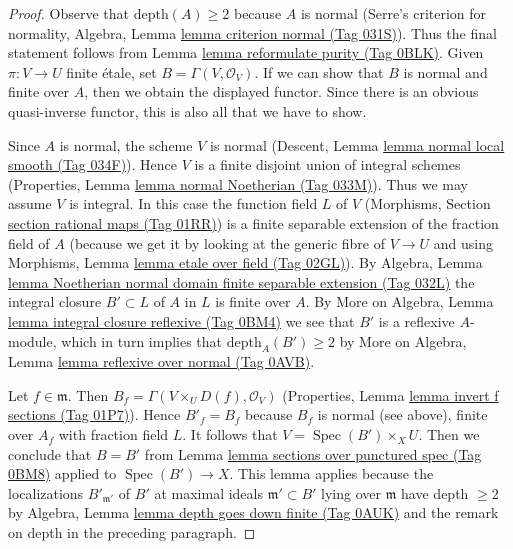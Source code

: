 \documentclass{amsart}
\theoremstyle{plain}
\theoremstyle{definition}
\theoremstyle{remark}
\numberwithin{equation}{subsection}
\def\Spec{\mathop{\mathrm{Spec}}}
\begin{document}
\begin{proof}
Observe that $\text{depth}(A) \geq 2$ because $A$ is normal
(Serre's criterion for normality, Algebra, Lemma
\href{https://stacks.math.columbia.edu/tag/031S}{lemma criterion normal (Tag 031S)}).
Thus the final statement follows from Lemma \href{https://stacks.math.columbia.edu/tag/0BLK}{lemma reformulate purity (Tag 0BLK)}.
Given $\pi : V \to U$ finite \'etale, set $B = \Gamma(V, \mathcal{O}_V)$.
If we can show that $B$ is normal and finite over $A$, then
we obtain the displayed functor. Since there is an obvious
quasi-inverse functor, this is also all that we have to show.

\medskip\noindent
Since $A$ is normal, the scheme $V$ is normal
(Descent, Lemma \href{https://stacks.math.columbia.edu/tag/034F}{lemma normal local smooth (Tag 034F)}).
Hence $V$ is a finite disjoint union of integral schemes
(Properties, Lemma \href{https://stacks.math.columbia.edu/tag/033M}{lemma normal Noetherian (Tag 033M)}).
Thus we may assume $V$ is integral.
In this case the function field $L$ of $V$
(Morphisms, Section \href{https://stacks.math.columbia.edu/tag/01RR}{section rational maps (Tag 01RR)})
is a finite separable extension of the fraction field of $A$
(because we get it by looking at the generic fibre
of $V \to U$ and using Morphisms, Lemma
\href{https://stacks.math.columbia.edu/tag/02GL}{lemma etale over field (Tag 02GL)}).
By Algebra, Lemma
\href{https://stacks.math.columbia.edu/tag/032L}{lemma Noetherian normal domain finite separable extension (Tag 032L)}
the integral closure $B' \subset L$ of $A$ in $L$ is finite over $A$.
By More on Algebra, Lemma \href{https://stacks.math.columbia.edu/tag/0BM4}{lemma integral closure reflexive (Tag 0BM4)}
we see that $B'$ is a reflexive $A$-module, which in turn implies
that $\text{depth}_A(B') \geq 2$ by
More on Algebra, Lemma \href{https://stacks.math.columbia.edu/tag/0AVB}{lemma reflexive over normal (Tag 0AVB)}.

\medskip\noindent
Let $f \in \mathfrak m$. Then $B_f = \Gamma(V \times_U D(f), \mathcal{O}_V)$
(Properties, Lemma \href{https://stacks.math.columbia.edu/tag/01P7}{lemma invert f sections (Tag 01P7)}).
Hence $B'_f = B_f$ because $B_f$ is normal (see above),
finite over $A_f$ with fraction field $L$.
It follows that $V = \Spec(B') \times_X U$.
Then we conclude that $B = B'$ from
Lemma \href{https://stacks.math.columbia.edu/tag/0BM8}{lemma sections over punctured spec (Tag 0BM8)}
applied to $\Spec(B') \to X$.
This lemma applies because the localizations $B'_{\mathfrak m'}$
of $B'$ at maximal ideals $\mathfrak m' \subset B'$ lying over
$\mathfrak m$ have depth $\geq 2$ by
Algebra, Lemma \href{https://stacks.math.columbia.edu/tag/0AUK}{lemma depth goes down finite (Tag 0AUK)}
and the remark on depth in the preceding paragraph.
\end{proof}
\end{document}
